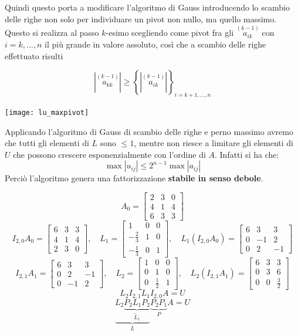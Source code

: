 \documentclass{article}
\begin{document}
Quindi questo porta a modificare l'algoritmo di Gauss introducendo lo scambio delle
righe non solo per individuare un pivot non nullo, ma quello massimo. Questo
si realizza al passo $k$-esimo scegliendo come pivot fra gli
$\overset{(k-1)}{a_{ik}}$ con $i=k,\ldots,n$ il più grande in valore assoluto,
così che a scambio delle righe effettuato risulti 

$$\left\lvert \overset{(k-1)}{a_{kk}}\right\rvert \geq\left\{\left\lvert
\overset{(k-1)}{a_{ik}}\right\rvert\right\}_{i=k+1,\ldots,n}$$ 
\begin{center}
    \texttt{[image: lu\_maxpivot]}
\end{center}

Applicando l'algoritmo di Gauss di scambio delle righe e perno massimo
avremo che tutti gli elementi di $L$ sono $\leq 1$, mentre non riesce a
limitare gli elementi di $U$ che possono crescere esponenzialmente con
l'ordine di $A$. Infatti si ha che:
$$\max \left\lvert u_{ij}\right\rvert\leq 2^{n-1}\max \left\lvert
a_{ij}\right\rvert$$
Perciò l'algoritmo genera una fattorizzazione \textbf{stabile in senso
debole}.
\begin{example}
    $$A_0=\begin{bmatrix}
        2 & 3 & 0 \\ 
        4 & 1 & 4 \\ 
        6 & 3 & 3
    \end{bmatrix}$$
    $$
    I_{2,0}A_{0}=\begin{bmatrix}
        6 & 3 & 3 \\ 
        4 & 1 & 4 \\ 
        2 & 3 & 0
    \end{bmatrix},\quad L_1=\begin{bmatrix}
        1 & 0 & 0 \\ 
        -\frac{2}{3} & 1 & 0 \\ 
        -\frac{1}{3} & 0 & 1
    \end{bmatrix},\quad
    L_1(I_{2,0}A_{0})=\begin{bmatrix}
        6 & 3 & 3 \\ 
        0 & -1 & 2 \\ 
        0 & 2 & -1
    \end{bmatrix}
    $$
    $$
    I_{2,1}A_{1}=\begin{bmatrix}
        6 & 3 & 3 \\ 
        0 & 2 & -1 \\
        0 & -1 & 2 
    \end{bmatrix},\quad L_2=\begin{bmatrix}
        1 & 0 & 0 \\ 
        0 & 1 & 0 \\ 
        0 & \frac{1}{2} & 1
    \end{bmatrix},\quad
    L_2(I_{2,1}A_{1})=\begin{bmatrix}
        6 & 3 & 3 \\ 
        0 & 3 & 6 \\ 
        0 & 0 & \frac{3}{2}
    \end{bmatrix}
    $$
    $$L_2I_{2,1}L_1I_{2,0}A=U$$
    $$\underbrace{L_2\underbrace{P_2L_1P_2}_{\tilde{L}_1}}_{L}\underbrace{P_2P_1}_{P}A=U$$
\end{example}
\end{document}
